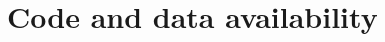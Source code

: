 \documentclass[hidelinks]{siamart}
\theoremstyle{nonumberplain}
\numberwithin{theorem}{section}
\begin{document}
\section*{Code and data availability}

% 




\end{document}
